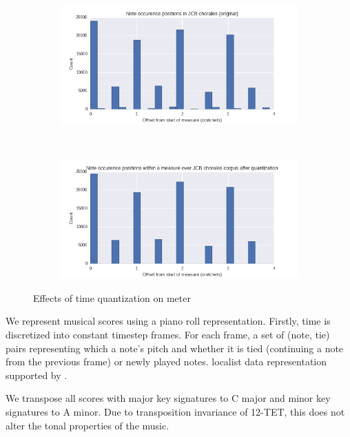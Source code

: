 \documentclass[dissertation.tex]{subfiles}
\begin{document}
\begin{figure}[htpb]
    \centering
    \begin{subfigure}[t]{0.48\textwidth}
        \centering
        \includegraphics[width=1.0\linewidth]{Figures/meter-usage-original.png}
    \end{subfigure}
    ~
    \begin{subfigure}[t]{0.48\textwidth}
        \centering
        \includegraphics[width=1.0\linewidth]{Figures/meter-usage-quantized.png}
    \end{subfigure}
    \caption{Effects of time quantization on meter}
    \label{fig:meter-time-quantization}
\end{figure}

We represent musical scores using a piano roll representation. Firstly, time is
discretized into constant timestep frames. For each frame, a set of (note, tie)
pairs representing which a note's pitch and whether it is tied
(continuing a note from the previous frame) or newly played notes.
localist data representation supported by \cite{todd1989connectionist}.


We transpose all scores with major key signatures to C major and minor key
signatures to A minor. Due to transposition invariance of 12-TET, this does
not alter the tonal properties of the music.
\end{document}
